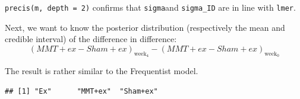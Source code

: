 \documentclass[
]{book}
\newenvironment{Shaded}{\begin{snugshade}}{\end{snugshade}}
\newcommand{\CommentTok}[1]{\textcolor[rgb]{0.56,0.35,0.01}{\textit{#1}}}
\newcommand{\FunctionTok}[1]{\textcolor[rgb]{0.13,0.29,0.53}{\textbf{#1}}}
\newcommand{\NormalTok}[1]{#1}
\newcommand{\SpecialCharTok}[1]{\textcolor[rgb]{0.81,0.36,0.00}{\textbf{#1}}}
\begin{document}
\texttt{precis(m,\ depth\ =\ 2)} confirms that \texttt{sigma}and \texttt{sigma\_ID} are in line with \texttt{lmer}.

Next, we want to know the posterior distribution (respectively the mean and credible interval)
of the difference in difference:
\[(MMT+ex - Sham+ex)_{\text{week}_4} - (MMT+ex - Sham+ex)_{\text{week}_0}\]

The result is rather similar to the Frequentist model.

\begin{Shaded}
\end{Shaded}

\begin{verbatim}
## [1] "Ex"      "MMT+ex"  "Sham+ex"
\end{verbatim}
\end{document}

